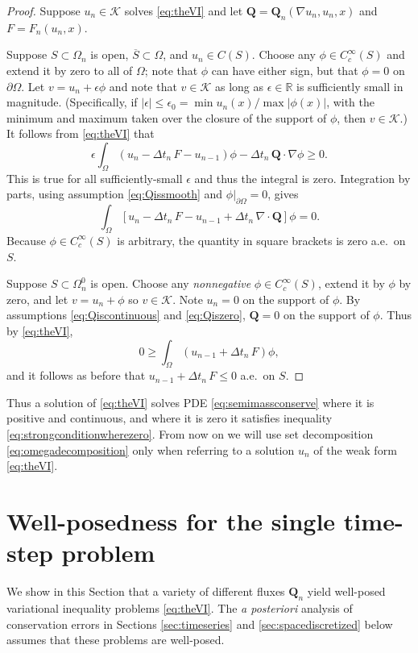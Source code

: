 \documentclass[final,onefignum]{siamart190516}
\newcommand\bQ{\mathbf{Q}}
\newcommand{\Div}{\nabla\cdot}
\newcommand\eps{\epsilon}
\newcommand{\grad}{\nabla}
\newcommand\RR{\mathbb{R}}
\begin{document}
\begin{proof}  Suppose $u_n\in\mathcal{K}$ solves \eqref{eq:theVI} and let $\bQ = \bQ_n(\grad u_n,u_n,x)$ and $F=F_n(u_n,x)$.

Suppose $S \subset \Omega_n$ is open, $\overline{S}\subset \Omega$, and $u_n\in C(S)$.  Choose any $\phi\in C_c^\infty(S)$ and extend it by zero to all of $\Omega$; note that $\phi$ can have either sign, but that $\phi=0$ on $\partial\Omega$.  Let $v = u_n + \eps \phi$ and note that $v \in \mathcal{K}$ as long as $\eps\in\RR$ is sufficiently small in magnitude.  (Specifically, if $|\eps|\le \eps_0 = \min u_n(x) / \max |\phi(x)|$, with the minimum and maximum taken over the closure of the support of $\phi$, then $v \in \mathcal{K}$.)  It follows from \eqref{eq:theVI} that
   $$\eps \int_\Omega \left(u_n - \Delta t_n\,F - u_{n-1}\right)\phi - \Delta t_n\,\bQ \cdot \grad \phi \ge 0.$$
This is true for all sufficiently-small $\eps$ and thus the integral is zero.  Integration by parts, using assumption \eqref{eq:Qissmooth} and $\phi\big|_{\partial\Omega}=0$, gives
   $$\int_\Omega \left[ u_n - \Delta t_n\,F - u_{n-1} + \Delta t_n\,\Div\bQ \right]\phi = 0.$$
Because $\phi\in C_c^\infty(S)$ is arbitrary, the quantity in square brackets is zero a.e.~on $S$.

Suppose $S \subset \Omega_n^0$ is open.  Choose any \emph{nonnegative} $\phi\in C_c^\infty(S)$, extend it by $\phi$ by zero, and let $v = u_n + \phi$ so $v\in\mathcal{K}$.  Note $u_n=0$ on the support of $\phi$.  By assumptions \eqref{eq:Qiscontinuous} and \eqref{eq:Qiszero}, $\bQ=0$ on the support of $\phi$.  Thus by \eqref{eq:theVI},
    $$0 \ge \int_{\Omega} \left(u_{n-1} + \Delta t_n\, F\right) \phi,$$
and it follows as before that $u_{n-1} + \Delta t_n\, F \le 0$ a.e.~on $S$. \end{proof}

Thus a solution of \eqref{eq:theVI} solves PDE \eqref{eq:semimassconserve} where it is positive and continuous, and where it is zero it satisfies inequality \eqref{eq:strongconditionwherezero}.  From now on we will use set decomposition \eqref{eq:omegadecomposition} only when referring to a solution $u_n$ of the weak form \eqref{eq:theVI}.


\section{Well-posedness for the single time-step problem} \label{sec:wellposed}

We show in this Section that a variety of different fluxes $\bQ_n$ yield well-posed variational inequality problems \eqref{eq:theVI}.  The \emph{a posteriori} analysis of conservation errors in Sections \ref{sec:timeseries} and \ref{sec:spacediscretized} below assumes that these problems are well-posed.
\end{document}
